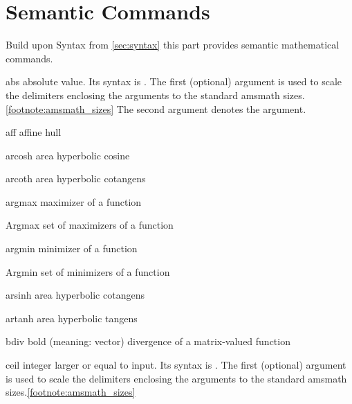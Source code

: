 \documentclass[english,a4paper,DIV=12,parskip=full,oneside]{scrartcl}
\begin{document}
    \section{Semantic Commands}
        \label{sec:semantic}
        Build upon Syntax from \cref{sec:syntax} this part provides semantic mathematical commands.

    \begin{commandlist}
        \item[abs] absolute value.
            Its syntax is .
            The first (optional) argument is used to scale the delimiters enclosing the arguments to the standard amsmath sizes.\cref{footnote:amsmath_sizes}
            The second argument denotes the argument.
            \par{}
            \par{}
            \par{}
        \item[aff] affine hull \mathCodeExample{\aff}
        \item[arcosh] area hyperbolic cosine \mathCodeExample{\arcosh}
        \item[arcoth] area hyperbolic cotangens \mathCodeExample{\arcoth}
        \item[argmax] maximizer of a function
        \item[Argmax] set of maximizers of a function
        \item[argmin] minimizer of a function
        \item[Argmin] set of minimizers of a function
        \item[arsinh] area hyperbolic cotangens \mathCodeExample{\arsinh}
        \item[artanh] area hyperbolic tangens \mathCodeExample{\artanh}
        \item[bdiv] bold (meaning: vector) divergence of a matrix-valued function \mathCodeExample{\bdiv}
        \item[ceil] integer larger or equal to input.
            Its syntax is .
            The first (optional) argument is used to scale the delimiters enclosing the arguments to the standard amsmath sizes.\cref{footnote:amsmath_sizes}

\end{commandlist}
\end{document}
